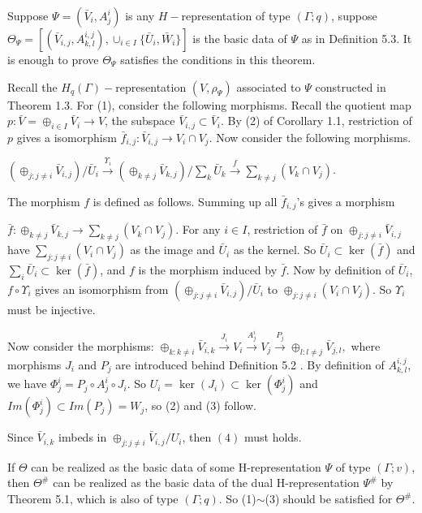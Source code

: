 \def\CTEXPreproc{Created by ctex v0.2.12, don't edit!}\documentclass[11pt]{article}
\begin{document}
  \begin{pf} Suppose  $\Psi =(\bar{V}_i , A^i _j )$ is any $H-$representation of type $(\Gamma;q)$, suppose
  $\Theta_{\Psi} = [ ( \bar{V}_{i,j} , A^{i,j}_{k,l} ) ,  \cup_{i\in I} \{ \bar{U}_i ,\bar{W}_i \}    ]$ is the basic data of $\Psi$  as in Definition 5.3.
  It is enough to prove $\Theta_{\Psi}$ satisfies the conditions in this theorem.

   Recall the $H_{q}(\Gamma)-$representation $(V, \rho_{\Psi})$ associated to $\Psi$ constructed in Theorem 1.3.
    For (1), consider the following morphisms. Recall the quotient map $p: \bar{V}=\oplus_{i\in I} \bar{V}_i \rightarrow V$, the subspace
    $\bar{V}_{i,j}\subset \bar{V}_i $. By (2) of Corollary 1.1, restriction of $p$ gives a isomorphism $\bar{f}_{i,j}: \bar{V}_{i,j} \rightarrow V_i \cap V_j  $. Now consider the following morphisms.

     $ (\oplus_{j:j\neq i} \bar{V}_{i,j})/\bar{U}_i  \stackrel{\Upsilon_i }{\longrightarrow}   (\oplus_{k\neq j} \bar{V}_{k,j}) /\sum_{k} \bar{U}_k \stackrel{f }{\longrightarrow}  \sum_{k\neq j} (V_{k}\cap V_{j} ) $.

     The morphism $f$ is defined as follows. Summing up all $\bar{f}_{i,j}$'s gives a morphism

    \noindent $\bar{f}: \oplus_{k\neq j} \bar{V}_{k,j}\rightarrow  \sum_{k\neq j} (V_{k}\cap V_{j} ) $. For any $i\in I$, restriction of $\bar{f}$ on $\oplus_{j:j \neq i} \bar{V}_{i,j}$ have $ \sum_{j: j\neq i} (V_{i}\cap V_{j} )  $ as the image and $\bar{U}_i$ as the kernel. So $\bar{U}_i \subset \ker (\bar{f})$ and $ \sum_{i} \bar{U}_i  \subset \ker(\bar{f}) $, and $f$ is the morphism  induced by  $\bar{f}$.  Now by definition of $\bar{U}_i$, $f\circ \Upsilon_i $ gives an isomorphism from $(\oplus_{j:j\neq i} \bar{V}_{i,j})/\bar{U}_i $ to $\oplus_{j:j\neq i} (V_i \cap V_j)  $. So $\Upsilon_i $ must be injective.

     Now consider the morphisms:
$ \oplus_{k:k\neq i} \bar{V}_{i,k}  \stackrel{J_i }{\longrightarrow}   V_i \stackrel{A^i _j }{\longrightarrow}  V_j
     \stackrel{ P_j  }{\longrightarrow}   \oplus_{l:l\neq j} \bar{V}_{j,l} ,  $
     where morphisms $J_i $ and $P_j$ are  introduced behind Definition 5.2 . By definition of
     $ A^{i,j} _{k,l} $, we have $ \Phi^i _j =  P_j \circ A^i _j \circ J_i   $. So $U_i = \ker( J_i  ) \subset \ker(  \Phi^i _j  )   $
      and $Im( \Phi^i _j   )\subset Im (  P_j )= W_j   $, so (2) and (3) follow.

      Since $\bar{V}_{i,k} $ imbeds in $ \oplus_{j: j\neq i} \bar{V}_{i,j} / U_i $, then $(4)$ must holds.

      If $\Theta$ can be realized as the basic data of some H-representation  $\Psi$ of type $(\Gamma;v)$, then $\Theta^{\#}$ can be realized as the basic data of the dual H-representation $\Psi^{\#}$ by Theorem 5.1, which is also of type $(\Gamma;q)$. So
      (1)$\sim$(3) should be satisfied for $\Theta^{\#}$.


  \end{pf}
\end{document}
